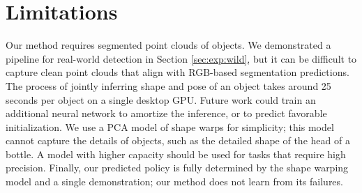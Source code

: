 \documentclass{article}
\begin{document}
\section{Limitations}

Our method requires segmented point clouds of objects. We demonstrated a pipeline for real-world detection in Section \ref{sec:exp:wild}, but it can be difficult to capture clean point clouds that align with RGB-based segmentation predictions. The process of jointly inferring shape and pose of an object takes around 25 seconds per object on a single desktop GPU. Future work could train an additional neural network to amortize the inference, or to predict favorable initialization. We use a PCA model of shape warps for simplicity; this model cannot capture the details of objects, such as the detailed shape of the head of a bottle. A model with higher capacity should be used for tasks that require high precision. Finally, our predicted policy is fully determined by the shape warping model and a single demonstration; our method does not learn from its failures.

\end{document}
